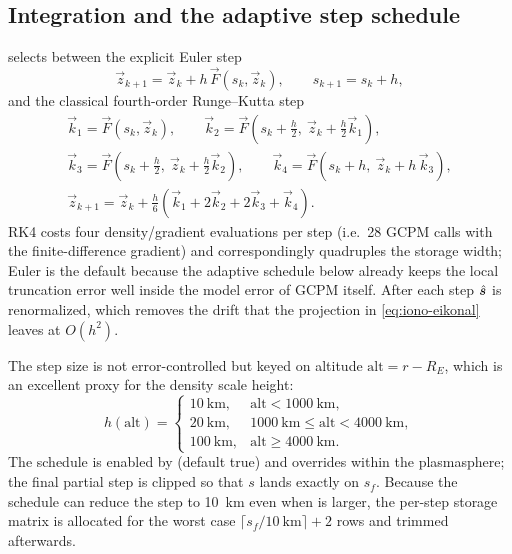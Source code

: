 \subsection{Integration and the adaptive step schedule}
\label{sec:iono-integration}

 selects between the explicit Euler step
%
\begin{equation}
  \label{eq:iono-euler}
  \vec{z}_{k+1} = \vec{z}_k + h\,\vec{F}(s_k, \vec{z}_k),
  \qquad s_{k+1} = s_k + h ,
\end{equation}
%
and the classical fourth-order Runge--Kutta step \citep{hairer1993}
%
\begin{equation}
  \label{eq:iono-rk4}
  \begin{gathered}
    \vec{k}_1 = \vec{F}(s_k, \vec{z}_k), \qquad
    \vec{k}_2 = \vec{F}\!\left(s_k + \tfrac{h}{2},\ \vec{z}_k + \tfrac{h}{2}\vec{k}_1\right), \\
    \vec{k}_3 = \vec{F}\!\left(s_k + \tfrac{h}{2},\ \vec{z}_k + \tfrac{h}{2}\vec{k}_2\right), \qquad
    \vec{k}_4 = \vec{F}\!\left(s_k + h,\ \vec{z}_k + h\,\vec{k}_3\right), \\
    \vec{z}_{k+1} = \vec{z}_k
      + \frac{h}{6}\left(\vec{k}_1 + 2\vec{k}_2 + 2\vec{k}_3 + \vec{k}_4\right) .
  \end{gathered}
\end{equation}
%
RK4 costs four density/gradient evaluations per step (i.e.\ 28 GCPM calls with
the finite-difference gradient) and correspondingly quadruples the storage
width; Euler is the default because the adaptive schedule below already keeps
the local truncation error well inside the model error of GCPM itself.  After
each step $\hat{\bm{s}}$ is renormalized, which removes the drift that the
projection in \cref{eq:iono-eikonal} leaves at $O(h^2)$.

The step size is not error-controlled but keyed on altitude
$\mathrm{alt} = r - R_E$, which is an excellent proxy for the density scale
height:
%
\begin{equation}
  \label{eq:iono-step}
  h(\mathrm{alt}) =
  \begin{cases}
    \SI{10}{\kilo\meter},  & \mathrm{alt} < \SI{1000}{\kilo\meter}, \\
    \SI{20}{\kilo\meter},  & \SI{1000}{\kilo\meter} \le \mathrm{alt} < \SI{4000}{\kilo\meter}, \\
    \SI{100}{\kilo\meter}, & \mathrm{alt} \ge \SI{4000}{\kilo\meter} .
  \end{cases}
\end{equation}
%
The schedule is enabled by  (default true) and
overrides  within the plasmasphere; the final partial
step is clipped so that $s$ lands exactly on $s_f$.  Because the schedule can
reduce the step to \SI{10}{\kilo\meter} even when  is
larger, the per-step storage matrix is allocated for the worst case
$\lceil s_f/\SI{10}{\kilo\meter}\rceil + 2$ rows and trimmed afterwards.

